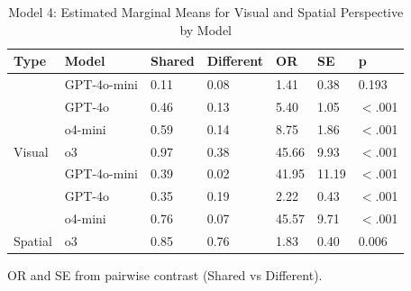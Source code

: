 \begin{table}[!h]
\centering
\caption{\label{tab:model4_emm_summary}Model 4: Estimated Marginal Means for Visual and Spatial Perspective by Model}
\centering
\begin{threeparttable}
\begin{tabular}[t]{lllllll}
\toprule
Type & Model & Shared & Different & OR & SE & p\\
\midrule
 & GPT-4o-mini & 0.11 & 0.08 & 1.41 & 0.38 & 0.193\\

 & GPT-4o & 0.46 & 0.13 & 5.40 & 1.05 & $<$.001\\

 & o4-mini & 0.59 & 0.14 & 8.75 & 1.86 & $<$.001\\

\multirow[t]{-4}{*}{\raggedright\arraybackslash Visual} & o3 & 0.97 & 0.38 & 45.66 & 9.93 & $<$.001\\

 & GPT-4o-mini & 0.39 & 0.02 & 41.95 & 11.19 & $<$.001\\

 & GPT-4o & 0.35 & 0.19 & 2.22 & 0.43 & $<$.001\\

 & o4-mini & 0.76 & 0.07 & 45.57 & 9.71 & $<$.001\\

\multirow[t]{-4}{*}{\raggedright\arraybackslash Spatial} & o3 & 0.85 & 0.76 & 1.83 & 0.40 & 0.006\\
\bottomrule
\end{tabular}
\begin{tablenotes}
\item OR and SE from pairwise contrast (Shared vs Different).
\end{tablenotes}
\end{threeparttable}
\end{table}
